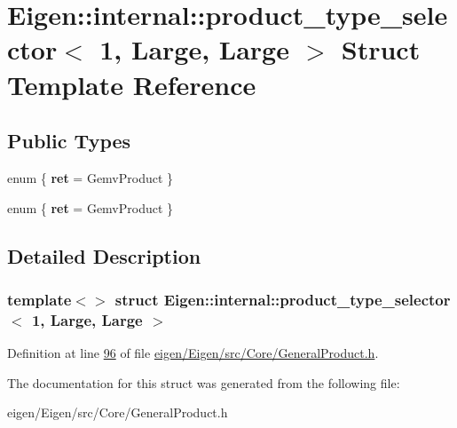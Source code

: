 \hypertarget{struct_eigen_1_1internal_1_1product__type__selector_3_011_00_01_large_00_01_large_01_4}{}\section{Eigen\+:\+:internal\+:\+:product\+\_\+type\+\_\+selector$<$ 1, Large, Large $>$ Struct Template Reference}
\label{struct_eigen_1_1internal_1_1product__type__selector_3_011_00_01_large_00_01_large_01_4}
\subsection*{Public Types}
\begin{DoxyCompactItemize}
\item 
\mbox{\label{struct_eigen_1_1internal_1_1product__type__selector_3_011_00_01_large_00_01_large_01_4_a253b2b33c19915878041439073f68d87}} 
enum \{ {\bfseries ret} = Gemv\+Product
 \}
\item 
\mbox{\label{struct_eigen_1_1internal_1_1product__type__selector_3_011_00_01_large_00_01_large_01_4_a0d66de154fe58e7ee5fee3cd28cda317}} 
enum \{ {\bfseries ret} = Gemv\+Product
 \}
\end{DoxyCompactItemize}


\subsection{Detailed Description}
\subsubsection*{template$<$$>$\newline
struct Eigen\+::internal\+::product\+\_\+type\+\_\+selector$<$ 1, Large, Large $>$}



Definition at line \hyperlink{eigen_2_eigen_2src_2_core_2_general_product_8h_source_l00096}{96} of file \hyperlink{eigen_2_eigen_2src_2_core_2_general_product_8h_source}{eigen/\+Eigen/src/\+Core/\+General\+Product.\+h}.



The documentation for this struct was generated from the following file\+:\begin{DoxyCompactItemize}
\item 
eigen/\+Eigen/src/\+Core/\+General\+Product.\+h\end{DoxyCompactItemize}
